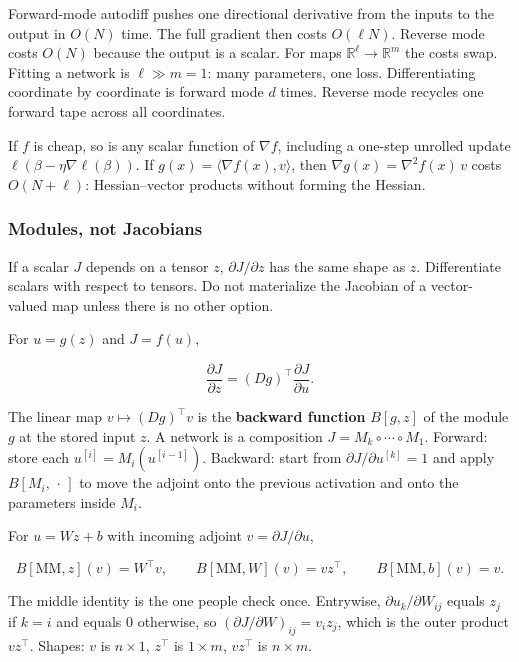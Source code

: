 \documentclass[
]{book}
\begin{document}
Forward-mode autodiff pushes one directional derivative from the inputs to the output in \(O(N)\) time. The full gradient then costs \(O(\ell N)\). Reverse mode costs \(O(N)\) because the output is a scalar. For maps \(\mathbb{R}^\ell\to\mathbb{R}^m\) the costs swap. Fitting a network is \(\ell\gg m=1\): many parameters, one loss. Differentiating coordinate by coordinate is forward mode \(d\) times. Reverse mode recycles one forward tape across all coordinates.

If \(f\) is cheap, so is any scalar function of \(\nabla f\), including a one-step unrolled update \(\ell(\beta-\eta\nabla\ell(\beta))\). If \(g(x)=\langle\nabla f(x),v\rangle\), then \(\nabla g(x)=\nabla^2 f(x)\,v\) costs \(O(N+\ell)\): Hessian--vector products without forming the Hessian.

\subsubsection*{Modules, not Jacobians}\label{modules-not-jacobians}

If a scalar \(J\) depends on a tensor \(z\), \(\partial J/\partial z\) has the same shape as \(z\). Differentiate scalars with respect to tensors. Do not materialize the Jacobian of a vector-valued map unless there is no other option.

For \(u=g(z)\) and \(J=f(u)\),

\[
\frac{\partial J}{\partial z}=(Dg)^\top\frac{\partial J}{\partial u}.
\]

The linear map \(v\mapsto(Dg)^\top v\) is the \textbf{backward function} \(B[g,z]\) of the module \(g\) at the stored input \(z\). A network is a composition \(J=M_k\circ\cdots\circ M_1\). Forward: store each \(u^{[i]}=M_i(u^{[i-1]})\). Backward: start from \(\partial J/\partial u^{[k]}=1\) and apply \(B[M_i,\,\cdot\,]\) to move the adjoint onto the previous activation and onto the parameters inside \(M_i\).

For \(u=Wz+b\) with incoming adjoint \(v=\partial J/\partial u\),

\[
B[\mathrm{MM},z](v)=W^\top v,
\qquad
B[\mathrm{MM},W](v)=vz^\top,
\qquad
B[\mathrm{MM},b](v)=v.
\]

The middle identity is the one people check once. Entrywise, \(\partial u_k/\partial W_{ij}\) equals \(z_j\) if \(k=i\) and equals \(0\) otherwise, so \((\partial J/\partial W)_{ij}=v_i z_j\), which is the outer product \(vz^\top\). Shapes: \(v\) is \(n\times 1\), \(z^\top\) is \(1\times m\), \(vz^\top\) is \(n\times m\).
\end{document}
